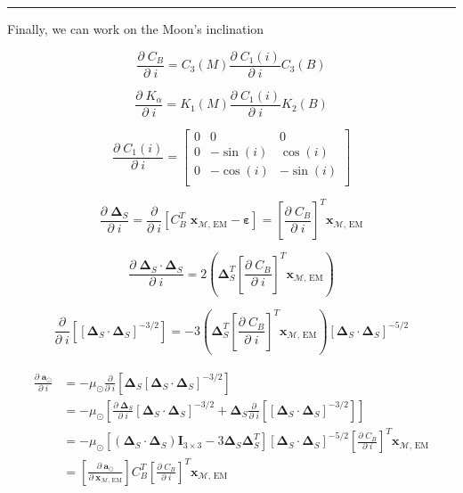 \documentclass[]{article}
\newcommand{\pd}[2]{\frac{\partial\;#1}{\partial\;#2}}
\newcommand{\pddown}[2]{\frac{\partial}{\partial\;#2} \left[ #1 \right] }
\begin{document}
	\hrule \vspace{1em}
	
	Finally, we can work on the Moon's inclination
	
	\begin{equation*}
		\pd{C_B}{i} = C_3(M) \pd{C_1(i)}{i} C_3(B)
	\end{equation*}
	
	\begin{equation*}
		\pd{K_\alpha}{i} = K_1(M) \pd{C_1(i)}{i} K_2(B)
	\end{equation*}
	
	\begin{equation*}
		\pd{C_1(i)}{i} = \begin{bmatrix}
			0 & 0 & 0 \\
			0 & -\sin{(i)} & \cos{(i)} \\
			0 & -\cos{(i)} & -\sin{(i)} \\
		\end{bmatrix}
	\end{equation*}
	
	\begin{equation*}
		\pd{\boldsymbol{\Delta}_S}{i} = \pddown{C_B^T \; \mathbf{x}_{\mathcal{M}\text{, EM}} - \boldsymbol{\varepsilon}}{i} = \left[ \pd{C_B}{i} \right]^T \mathbf{x}_{\mathcal{M}\text{, EM}}
	\end{equation*}
	
	\begin{equation*}
		\pd{\boldsymbol{\Delta}_S \cdot \boldsymbol{\Delta}_S}{i} = 2\left( \boldsymbol{\Delta}_S^T \left[ \pd{C_B}{i} \right]^T \mathbf{x}_{\mathcal{M}\text{, EM}} \right)
	\end{equation*}
	
	\begin{equation*}
		\pddown{ [\boldsymbol{\Delta}_S \cdot \boldsymbol{\Delta}_S]^{-3/2} }{i} = -3 \left( \boldsymbol{\Delta}_S^T \left[ \pd{C_B}{i} \right]^T \mathbf{x}_{\mathcal{M}\text{, EM}} \right) [\boldsymbol{\Delta}_S \cdot \boldsymbol{\Delta}_S]^{-5/2}
	\end{equation*}
	
	\begin{align}
	\begin{split}
		\pd{\mathbf{a}_{\odot}}{i} 
		&= -\mu_\odot \pddown{ \boldsymbol{\Delta}_S [\boldsymbol{\Delta}_S \cdot \boldsymbol{\Delta}_S]^{-3/2} }{i} \\
		&= -\mu_\odot \left[ \pd{ \boldsymbol{\Delta}_S }{i}[\boldsymbol{\Delta}_S \cdot \boldsymbol{\Delta}_S]^{-3/2} + \boldsymbol{\Delta}_S  \pddown{ [\boldsymbol{\Delta}_S \cdot \boldsymbol{\Delta}_S]^{-3/2} }{i} \right] \\
		&= -\mu_\odot \left[ (\boldsymbol{\Delta}_S \cdot \boldsymbol{\Delta}_S)\mathbf{I}_{3\times 3} - 3 \boldsymbol{\Delta}_S \boldsymbol{\Delta}_S^T \right] [\boldsymbol{\Delta}_S \cdot \boldsymbol{\Delta}_S]^{-5/2} \left[ \pd{C_B}{i} \right]^T \mathbf{x}_{\mathcal{M}\text{, EM}} \\
		&= \left[\pd{\mathbf{a}_{\odot}}{ \mathbf{x}_{\mathcal{M}\text{, EM}} }\right] C_B^T \left[ \pd{C_B}{i} \right]^T \mathbf{x}_{\mathcal{M}\text{, EM}} \\
	\end{split}
	\end{align}
	
\end{document}
